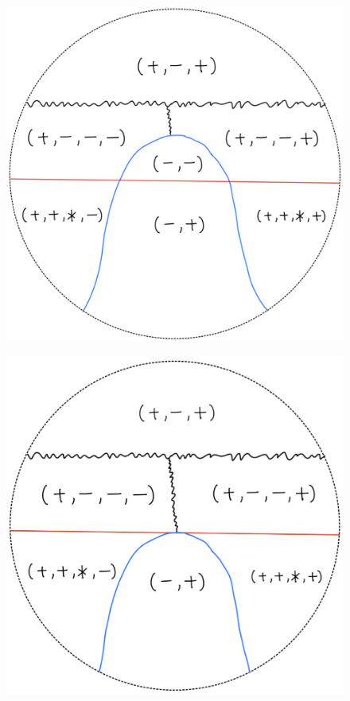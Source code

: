 \begin{definition}
\begin{enumerate}
\begin{itemize}
\begin{figure}[H]
    \caption{}
    \label{fig:your-label}
\end{figure}
\begin{figure}[H]
    \centering
    \includegraphics[scale = 0.95]{diagrams/lemma2/9.png} 
    \caption{}
    \label{fig:your-label}
\end{figure}
\begin{figure}[H]
    \centering
    \includegraphics[scale = 0.95]{diagrams/lemma2/10.png} 

\end{figure}
\end{itemize}
\end{enumerate}
\end{definition}
